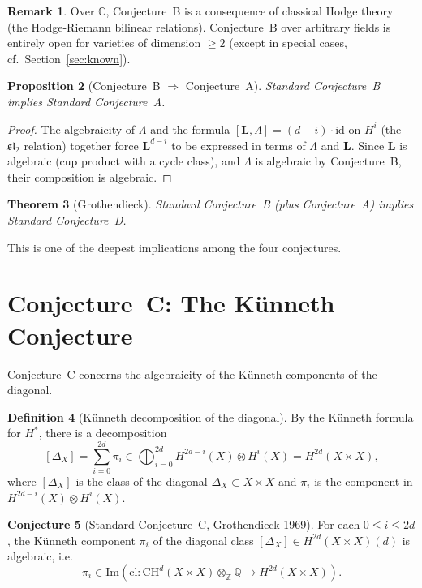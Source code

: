 \documentclass[12pt,a4paper]{amsart}
\newtheorem{theorem}{Theorem}[section]
\newtheorem{proposition}[theorem]{Proposition}
\theoremstyle{definition}
\newtheorem{definition}[theorem]{Definition}
\newtheorem{remark}[theorem]{Remark}
\newtheorem{conjecture}[theorem]{Conjecture}
\newcommand{\Z}{\mathbb{Z}}
\newcommand{\Q}{\mathbb{Q}}
\newcommand{\C}{\mathbb{C}}
\newcommand{\id}{\mathrm{id}}
\newcommand{\CH}{\mathrm{CH}}
\newcommand{\cl}{\mathrm{cl}}
\begin{document}
\begin{remark}
Over $\C$, Conjecture~B is a consequence of classical Hodge theory (the
Hodge-Riemann bilinear relations).  Conjecture~B over arbitrary fields is
entirely open for varieties of dimension $\geq 2$ (except in special cases,
cf.\ Section~\ref{sec:known}).
\end{remark}

\begin{proposition}[Conjecture~B $\Rightarrow$ Conjecture~A]
Standard Conjecture~B implies Standard Conjecture~A.
\end{proposition}

\begin{proof}
The algebraicity of $\Lambda$ and the formula $[\mathbf{L}, \Lambda] =
(d - i)\cdot\id$ on $H^i$ (the $\mathfrak{sl}_2$ relation) together force
$\mathbf{L}^{d-i}$ to be expressed in terms of $\Lambda$ and $\mathbf{L}$.
Since $\mathbf{L}$ is algebraic (cup product with a cycle class), and $\Lambda$
is algebraic by Conjecture~B, their composition is algebraic.
\end{proof}

\begin{theorem}[Grothendieck]\label{thm:B_implies_D}
Standard Conjecture~B (plus Conjecture~A) implies Standard Conjecture~D.
\end{theorem}

This is one of the deepest implications among the four conjectures.

\section{Conjecture~C: The K\"{u}nneth Conjecture}\label{sec:conjC}

Conjecture~C concerns the algebraicity of the K\"unneth components of the
diagonal.

\begin{definition}[K\"unneth decomposition of the diagonal]
By the K\"unneth formula for $H^*$, there is a decomposition
\[
  [\Delta_X] = \sum_{i=0}^{2d} \pi_i \in \bigoplus_{i=0}^{2d} H^{2d-i}(X)
  \otimes H^i(X) = H^{2d}(X \times X),
\]
where $[\Delta_X]$ is the class of the diagonal $\Delta_X \subset X \times X$
and $\pi_i$ is the component in $H^{2d-i}(X) \otimes H^i(X)$.
\end{definition}

\begin{conjecture}[Standard Conjecture~C, Grothendieck 1969]\label{conj:C}
For each $0 \leq i \leq 2d$, the K\"unneth component $\pi_i$ of the
diagonal class $[\Delta_X] \in H^{2d}(X \times X)(d)$ is algebraic, i.e.\
\[
  \pi_i \in \mathrm{Im}(\cl: \CH^d(X \times X) \otimes_\Z \Q \to H^{2d}(X \times X)).
\]
\end{conjecture}
\end{document}
